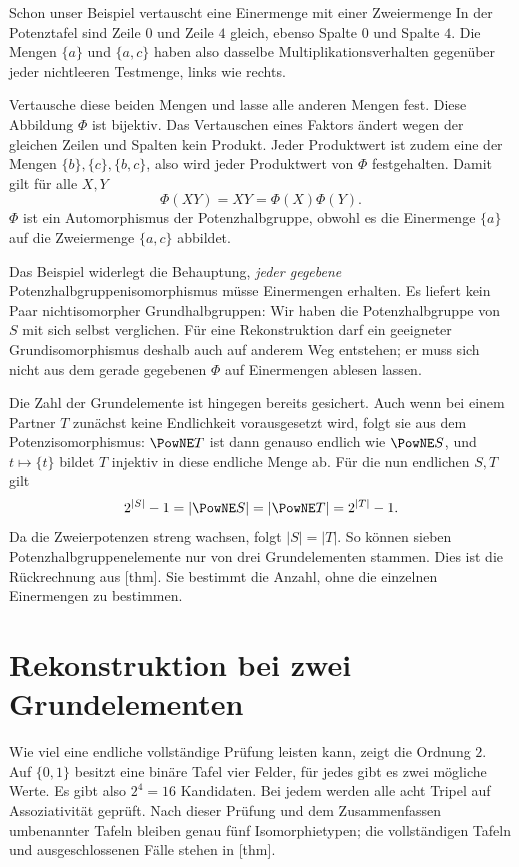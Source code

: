 \begin{FiniteSemigroupsReadingExample}{Schon unser Beispiel vertauscht eine Einermenge mit einer Zweiermenge}
In der Potenztafel sind Zeile \(0\) und Zeile \(4\) gleich, ebenso
Spalte \(0\) und Spalte \(4\). Die Mengen \(\{a\}\) und \(\{a,c\}\)
haben also dasselbe Multiplikationsverhalten gegenüber jeder
nichtleeren Testmenge, links wie rechts.

Vertausche diese beiden Mengen und lasse alle anderen Mengen fest.
Diese Abbildung \(\Phi\) ist bijektiv. Das Vertauschen eines Faktors
ändert wegen der gleichen Zeilen und Spalten kein Produkt. Jeder
Produktwert ist zudem eine der Mengen \(\{b\},\{c\},\{b,c\}\),
also wird jeder Produktwert von \(\Phi\) festgehalten. Damit gilt
für alle \(X,Y\)
\[
  \Phi(XY)=XY=\Phi(X)\Phi(Y).
\]
\(\Phi\) ist ein Automorphismus der Potenzhalbgruppe, obwohl es die
Einermenge \(\{a\}\) auf die Zweiermenge \(\{a,c\}\) abbildet.
\end{FiniteSemigroupsReadingExample}

Das Beispiel widerlegt die Behauptung, \emph{jeder gegebene}
Potenzhalbgruppenisomorphismus müsse Einermengen erhalten. Es liefert
kein Paar nichtisomorpher Grundhalbgruppen: Wir haben die
Potenzhalbgruppe von \(S\) mit sich selbst verglichen. Für eine
Rekonstruktion darf ein geeigneter Grundisomorphismus deshalb auch
auf anderem Weg entstehen; er muss sich nicht aus dem gerade
gegebenen \(\Phi\) auf Einermengen ablesen lassen.

Die Zahl der Grundelemente ist hingegen bereits gesichert. Auch wenn
bei einem Partner \(T\) zunächst keine Endlichkeit vorausgesetzt wird,
folgt sie aus dem Potenzisomorphismus: \(\PowNE T\) ist dann genauso
endlich wie \(\PowNE S\), und \(t\mapsto\{t\}\) bildet \(T\)
injektiv in diese endliche Menge ab. Für die nun endlichen \(S,T\) gilt
\[
  2^{|S|}-1=|\PowNE S|=|\PowNE T|=2^{|T|}-1.
\]
Da die Zweierpotenzen streng wachsen, folgt \(|S|=|T|\).
So können sieben Potenzhalbgruppenelemente nur von drei
Grundelementen stammen. Dies ist die Rückrechnung aus
[thm].
Sie bestimmt die Anzahl, ohne die einzelnen Einermengen zu bestimmen.

\section*{Rekonstruktion bei zwei Grundelementen}

Wie viel eine endliche vollständige Prüfung leisten kann, zeigt die
Ordnung \(2\). Auf \(\{0,1\}\) besitzt eine binäre Tafel vier Felder,
für jedes gibt es zwei mögliche Werte. Es gibt also \(2^4=16\)
Kandidaten. Bei jedem werden alle acht Tripel auf Assoziativität
geprüft. Nach dieser Prüfung und dem Zusammenfassen umbenannter
Tafeln bleiben genau fünf Isomorphietypen; die vollständigen Tafeln
und ausgeschlossenen Fälle stehen in
[thm].

